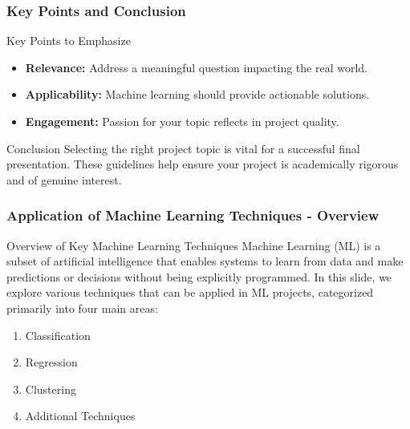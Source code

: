 \documentclass[aspectratio=169]{beamer}
\begin{document}
\begin{frame}[fragile]
    \frametitle{Key Points and Conclusion}
    \begin{block}{Key Points to Emphasize}
        \begin{itemize}
            \item \textbf{Relevance:} Address a meaningful question impacting the real world.
            \item \textbf{Applicability:} Machine learning should provide actionable solutions.
            \item \textbf{Engagement:} Passion for your topic reflects in project quality.
        \end{itemize}
    \end{block}

    \begin{block}{Conclusion}
        Selecting the right project topic is vital for a successful final presentation. These guidelines help ensure your project is academically rigorous and of genuine interest.
    \end{block}
\end{frame}

\begin{frame}[fragile]
    \frametitle{Application of Machine Learning Techniques - Overview}
    \begin{block}{Overview of Key Machine Learning Techniques}
        Machine Learning (ML) is a subset of artificial intelligence that enables systems to learn from data and make predictions or decisions without being explicitly programmed. In this slide, we explore various techniques that can be applied in ML projects, categorized primarily into four main areas:
    \end{block}
    \begin{enumerate}
        \item Classification
        \item Regression
        \item Clustering
        \item Additional Techniques
    \end{enumerate}
\end{frame}
\end{document}
